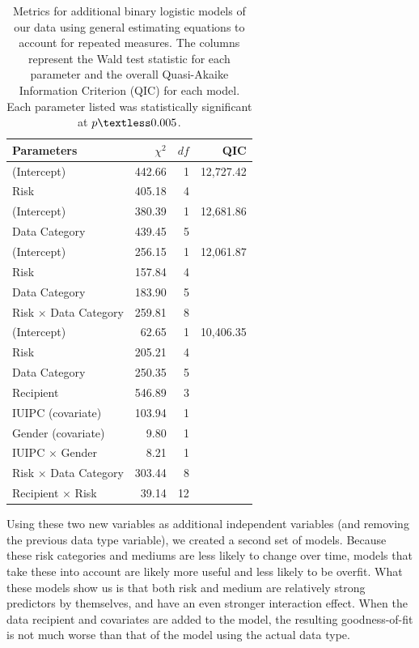 \documentclass[conference]{IEEEtran}
\begin{document}
\begin{table}[t]
\centering
\begin{tabular}{|l| r| r| r|}
\hline
Parameters & $\chi^2$ & $df$ & QIC\\
\hline
\hline
(Intercept) & 442.66 & 1 & 12,727.42\\
Risk & 405.18 & 4 & \\
\hline
(Intercept) & 380.39 & 1 & 12,681.86\\
Data Category & 439.45 & 5 & \\
\hline
(Intercept) & 256.15 & 1 & 12,061.87\\
Risk & 157.84 & 4 & \\
Data Category & 183.90 & 5 & \\
Risk $\times$ Data Category & 259.81 & 8 & \\
\hline
(Intercept) & 62.65 & 1 & 10,406.35\\
Risk & 205.21 & 4 & \\
Data Category & 250.35 & 5 & \\
Recipient & 546.89 & 3 & \\
IUIPC (covariate) & 103.94 & 1 & \\
Gender (covariate) & 9.80 & 1 & \\
IUIPC $\times$ Gender & 8.21 & 1 & \\
Risk $\times$ Data Category & 303.44 & 8 & \\
Recipient $\times$ Risk & 39.14 & 12 & \\
\hline
\end{tabular}
\caption{Metrics for additional binary logistic models of our data using general estimating equations to account for repeated measures. The columns represent the Wald test statistic for each parameter and the overall Quasi-Akaike Information Criterion (QIC) for each model. Each parameter listed was statistically significant at $p\textless0.005$.}
\label{regression2}
\end{table}

Using these two new variables as additional independent variables (and removing the previous data type variable), we created a second set of models. Because these risk categories and mediums are less likely to change over time, models that take these into account are likely more useful and less likely to be overfit. What these models show us is that both risk and medium are relatively strong predictors by themselves, and have an even stronger interaction effect. When the data recipient and covariates are added to the model, the resulting goodness-of-fit is not much worse than that of the model using the actual data type. 
\end{document}
